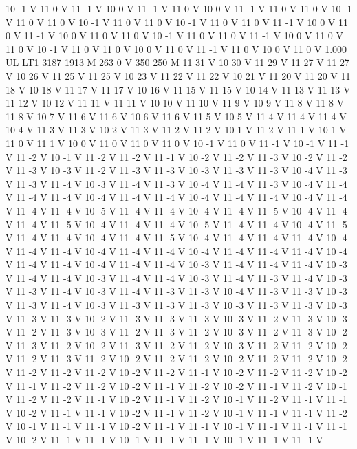 {10 -1 V
11 0 V
11 -1 V
10 0 V
11 -1 V
11 0 V
10 0 V
11 -1 V
11 0 V
11 0 V
10 -1 V
11 0 V
11 0 V
10 -1 V
11 0 V
11 0 V
10 -1 V
11 0 V
11 0 V
11 -1 V
10 0 V
11 0 V
11 -1 V
10 0 V
11 0 V
11 0 V
10 -1 V
11 0 V
11 0 V
11 -1 V
10 0 V
11 0 V
11 0 V
10 -1 V
11 0 V
11 0 V
10 0 V
11 0 V
11 -1 V
11 0 V
10 0 V
11 0 V
1.000 UL
LT1
3187 1913 M
263 0 V
350 250 M
11 31 V
10 30 V
11 29 V
11 27 V
11 27 V
10 26 V
11 25 V
11 25 V
10 23 V
11 22 V
11 22 V
10 21 V
11 20 V
11 20 V
11 18 V
10 18 V
11 17 V
11 17 V
10 16 V
11 15 V
11 15 V
10 14 V
11 13 V
11 13 V
11 12 V
10 12 V
11 11 V
11 11 V
10 10 V
11 10 V
11 9 V
10 9 V
11 8 V
11 8 V
11 8 V
10 7 V
11 6 V
11 6 V
10 6 V
11 6 V
11 5 V
10 5 V
11 4 V
11 4 V
11 4 V
10 4 V
11 3 V
11 3 V
10 2 V
11 3 V
11 2 V
11 2 V
10 1 V
11 2 V
11 1 V
10 1 V
11 0 V
11 1 V
10 0 V
11 0 V
11 0 V
11 0 V
10 -1 V
11 0 V
11 -1 V
10 -1 V
11 -1 V
11 -2 V
10 -1 V
11 -2 V
11 -2 V
11 -1 V
10 -2 V
11 -2 V
11 -3 V
10 -2 V
11 -2 V
11 -3 V
10 -3 V
11 -2 V
11 -3 V
11 -3 V
10 -3 V
11 -3 V
11 -3 V
10 -4 V
11 -3 V
11 -3 V
11 -4 V
10 -3 V
11 -4 V
11 -3 V
10 -4 V
11 -4 V
11 -3 V
10 -4 V
11 -4 V
11 -4 V
11 -4 V
10 -4 V
11 -4 V
11 -4 V
10 -4 V
11 -4 V
11 -4 V
10 -4 V
11 -4 V
11 -4 V
11 -4 V
10 -5 V
11 -4 V
11 -4 V
10 -4 V
11 -4 V
11 -5 V
10 -4 V
11 -4 V
11 -4 V
11 -5 V
10 -4 V
11 -4 V
11 -4 V
10 -5 V
11 -4 V
11 -4 V
10 -4 V
11 -5 V
11 -4 V
11 -4 V
10 -4 V
11 -4 V
11 -5 V
10 -4 V
11 -4 V
11 -4 V
11 -4 V
10 -4 V
11 -4 V
11 -4 V
10 -4 V
11 -4 V
11 -4 V
10 -4 V
11 -4 V
11 -4 V
11 -4 V
10 -4 V
11 -4 V
11 -4 V
10 -4 V
11 -4 V
11 -4 V
10 -3 V
11 -4 V
11 -4 V
11 -4 V
10 -3 V
11 -4 V
11 -4 V
10 -3 V
11 -4 V
11 -4 V
10 -3 V
11 -4 V
11 -3 V
11 -4 V
10 -3 V
11 -3 V
11 -4 V
10 -3 V
11 -4 V
11 -3 V
11 -3 V
10 -4 V
11 -3 V
11 -3 V
10 -3 V
11 -3 V
11 -4 V
10 -3 V
11 -3 V
11 -3 V
11 -3 V
10 -3 V
11 -3 V
11 -3 V
10 -3 V
11 -3 V
11 -3 V
10 -2 V
11 -3 V
11 -3 V
11 -3 V
10 -3 V
11 -2 V
11 -3 V
10 -3 V
11 -2 V
11 -3 V
10 -3 V
11 -2 V
11 -3 V
11 -2 V
10 -3 V
11 -2 V
11 -3 V
10 -2 V
11 -3 V
11 -2 V
10 -2 V
11 -3 V
11 -2 V
11 -2 V
10 -3 V
11 -2 V
11 -2 V
10 -2 V
11 -2 V
11 -3 V
11 -2 V
10 -2 V
11 -2 V
11 -2 V
10 -2 V
11 -2 V
11 -2 V
10 -2 V
11 -2 V
11 -2 V
11 -2 V
10 -2 V
11 -2 V
11 -1 V
10 -2 V
11 -2 V
11 -2 V
10 -2 V
11 -1 V
11 -2 V
11 -2 V
10 -2 V
11 -1 V
11 -2 V
10 -2 V
11 -1 V
11 -2 V
10 -1 V
11 -2 V
11 -2 V
11 -1 V
10 -2 V
11 -1 V
11 -2 V
10 -1 V
11 -2 V
11 -1 V
11 -1 V
10 -2 V
11 -1 V
11 -1 V
10 -2 V
11 -1 V
11 -2 V
10 -1 V
11 -1 V
11 -1 V
11 -2 V
10 -1 V
11 -1 V
11 -1 V
10 -2 V
11 -1 V
11 -1 V
10 -1 V
11 -1 V
11 -1 V
11 -1 V
10 -2 V
11 -1 V
11 -1 V
10 -1 V
11 -1 V
11 -1 V
10 -1 V
11 -1 V
11 -1 V
}
